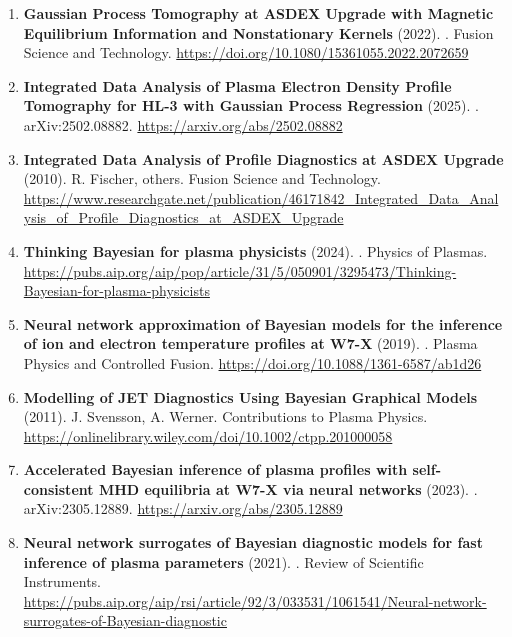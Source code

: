 \documentclass[11pt,a4paper]{article}
\begin{document}
\begin{enumerate}[leftmargin=1.4em]
\item \textbf{Gaussian Process Tomography at ASDEX Upgrade with Magnetic Equilibrium Information and Nonstationary Kernels} (2022). . Fusion Science and Technology. \url{https://doi.org/10.1080/15361055.2022.2072659}
\item \textbf{Integrated Data Analysis of Plasma Electron Density Profile Tomography for HL-3 with Gaussian Process Regression} (2025). . arXiv:2502.08882. \url{https://arxiv.org/abs/2502.08882}
\item \textbf{Integrated Data Analysis of Profile Diagnostics at ASDEX Upgrade} (2010). R. Fischer, others. Fusion Science and Technology. \url{https://www.researchgate.net/publication/46171842_Integrated_Data_Analysis_of_Profile_Diagnostics_at_ASDEX_Upgrade}
\item \textbf{Thinking Bayesian for plasma physicists} (2024). . Physics of Plasmas. \url{https://pubs.aip.org/aip/pop/article/31/5/050901/3295473/Thinking-Bayesian-for-plasma-physicists}
\item \textbf{Neural network approximation of Bayesian models for the inference of ion and electron temperature profiles at W7-X} (2019). . Plasma Physics and Controlled Fusion. \url{https://doi.org/10.1088/1361-6587/ab1d26}
\item \textbf{Modelling of JET Diagnostics Using Bayesian Graphical Models} (2011). J. Svensson, A. Werner. Contributions to Plasma Physics. \url{https://onlinelibrary.wiley.com/doi/10.1002/ctpp.201000058}
\item \textbf{Accelerated Bayesian inference of plasma profiles with self-consistent MHD equilibria at W7-X via neural networks} (2023). . arXiv:2305.12889. \url{https://arxiv.org/abs/2305.12889}
\item \textbf{Neural network surrogates of Bayesian diagnostic models for fast inference of plasma parameters} (2021). . Review of Scientific Instruments. \url{https://pubs.aip.org/aip/rsi/article/92/3/033531/1061541/Neural-network-surrogates-of-Bayesian-diagnostic}
\end{enumerate}
\end{document}
